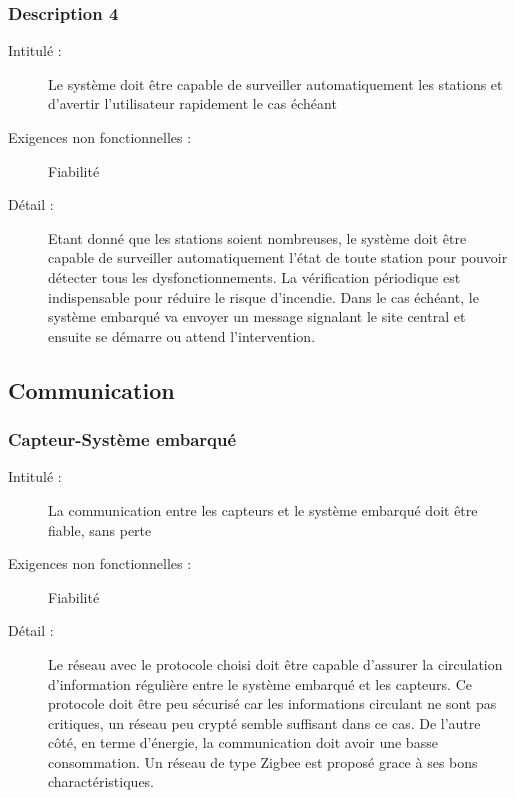 \subsubsection {Description 4}
\begin{description}
           \item[Intitulé :] Le système doit être capable de surveiller automatiquement les stations et d'avertir l’utilisateur rapidement le cas échéant 
           \item[Exigences non fonctionnelles :] Fiabilité
           \item[Détail :] Etant donné que les stations soient nombreuses, le système doit être capable de surveiller automatiquement  l’état de toute station pour pouvoir détecter tous les dysfonctionnements.  La vérification périodique est indispensable pour réduire le risque d’incendie.  
Dans le cas échéant, le système embarqué va envoyer un message signalant le site central et ensuite se démarre ou attend l'intervention.  
\end{description}

\subsection {Communication}
\subsubsection {Capteur-Système embarqué}
\begin{description}
           \item[Intitulé :] La communication entre les capteurs et le système embarqué doit être fiable, sans perte 
           \item[Exigences non fonctionnelles :] Fiabilité
           \item[Détail :] Le réseau avec le protocole choisi doit être capable d’assurer la circulation d’information régulière entre le système embarqué et les capteurs. Ce protocole doit être peu sécurisé car les informations circulant ne sont pas critiques, un réseau peu crypté semble suffisant dans ce cas. De l'autre côté, en terme d'énergie, la communication doit avoir une basse consommation.
Un réseau de type Zigbee est proposé grace à ses bons charactéristiques.
\end{description} 

